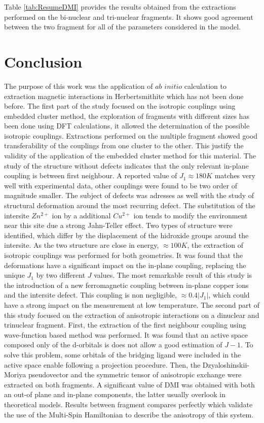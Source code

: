 \documentclass[12pt]{report}
\numberwithin{equation}{section}
\begin{document}
Table \ref{tab:ResumeDMI} provides the results obtained from the extractions performed on the bi-nuclear and tri-nuclear fragments. 
It shows good agreement between the two fragment for all of the parameters considered in the model.

\section{Conclusion}

The purpose of this work was the application of $ab$ $initio$ calculation to extraction magnetic interactions in Herbertsmithite which has not been done before.
The first part of the study focused on the isotropic couplings using embedded cluster method, the exploration of fragments with different sizes has been done using DFT calculations, it allowed the determination of the possible isotropic couplings.
Extractions performed on the multiple fragment showed good transferability of the couplings from one cluster to the other.
This justify the validity of the application of the embedded cluster method for this material.
The study of the structure without defects indicates that the only relevant in-plane coupling is between first neighbour.
A reported value of $J_1\approx180 K$ matches very well with experimental data, other couplings were found to be two order of magnitude smaller.
The subject of defects was adresses as well with the study of structural deformation around the most recurring defect. 
The substitution of the intersite $Zn^{2+}$ ion by a additional $Cu^{2+}$ ion tends to modify the environment near this site due a strong Jahn-Teller effect.
Two types of structure were identified, which differ by the displacement of the hidroxide groups around the intersite. 
As the two structure are close in energy, $\approx 100 K$, the extraction of isotropic couplings was performed for both geometries.
It was found that the deformations have a significant impact on the in-plane coupling, replacing the unique $J_1$ by two different $J$ values.
The most remarkable result of this study is the introduction of a new ferromagnetic coupling between in-plane copper ions and the intersite defect.
This coupling is non negligible, $\approx 0.4 |J_1|$, which could have a strong impact on the measurement at low temperature.
The second part of this study focused on the extraction of anisotropic interactions on a dinuclear and trinuclear fragment.
First, the extraction of the first neighbour coupling using wave-function based method was performed. 
It was found that an active space composed only of the d-orbitals is does not allow a good estimation of $J-1$.
To solve this problem, some orbitals of the bridging ligand were included in the active space enable following a projection procedure.
Then, the Dzyaloshinskii-Moriya pseudovector and the symmetric tensor of anisotropic exchange were extracted on both fragments.
A significant value of DMI was obtained with both an out-of plane and in-plane components, the latter usually overlook in theoretical models. 
Results between fragment compares perfectly which validate the use of the Multi-Spin Hamiltonian to describe the anisotropy of this system.
\end{document}
